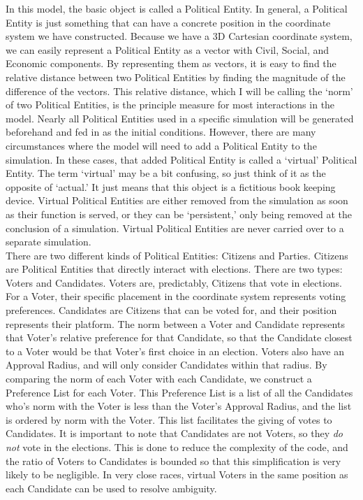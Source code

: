\documentclass[12pt]{article}
\begin{document}
\qquad In this model, the basic object is called a Political Entity. In general, a Political Entity is just something that can have a concrete position in the coordinate system we have constructed. Because we have a 3D Cartesian coordinate system, we can easily represent a Political Entity as a vector with Civil, Social, and Economic components. By representing them as vectors, it is easy to find the relative distance between two Political Entities by finding the magnitude of the difference of the vectors. This relative distance, which I will be calling the `norm' of two Political Entities, is the principle measure for most interactions in the model. Nearly all Political Entities used in a specific simulation will be generated beforehand and fed in as the initial conditions. However, there are many circumstances where the model will need to add a Political Entity to the simulation. In these cases, that added Political Entity is called a `virtual' Political Entity. The term `virtual' may be a bit confusing, so just think of it as the opposite of `actual.' It just means that this object is a fictitious book keeping device. Virtual Political Entities are either removed from the simulation as soon as their function is served, or they can be `persistent,' only being removed at the conclusion of a simulation. Virtual Political Entities are never carried over to a separate simulation. \\

\qquad There are two different kinds of Political Entities: Citizens and Parties. Citizens are Political Entities that directly interact with elections. There are two types: Voters and Candidates. Voters are, predictably, Citizens that vote in elections. For a Voter, their specific placement in the coordinate system represents voting preferences. Candidates are Citizens that can be voted for, and their position represents their platform. The norm between a Voter and Candidate represents that Voter's relative preference for that Candidate, so that the Candidate closest to a Voter would be that Voter's first choice in an election. Voters also have an Approval Radius, and will only consider Candidates within that radius. By comparing the norm of each Voter with each Candidate, we construct a Preference List for each Voter. This Preference List is a list of all the Candidates who's norm with the Voter is less than the Voter's Approval Radius, and the list is ordered by norm with the Voter. This list facilitates the giving of votes to Candidates. It is important to note that Candidates are not Voters, so they \textit{do not} vote in the elections. This is done to reduce the complexity of the code, and the ratio of Voters to Candidates is bounded so that this simplification is very likely to be negligible. In very close races, virtual Voters in the same position as each Candidate can be used to resolve ambiguity. \\
\end{document}
